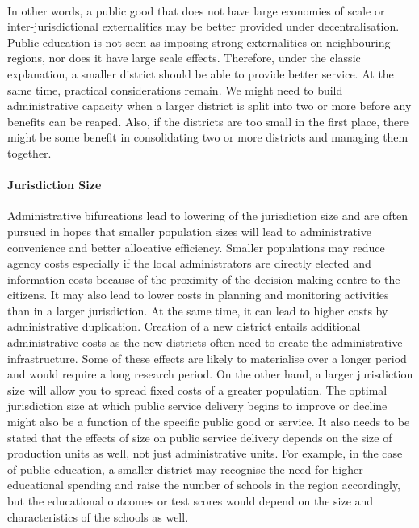 \documentclass[12pt, a4paper]{article}
\begin{document}
\paragraph{} In other words, a public good that does not have large economies of scale or inter-jurisdictional externalities may be better provided under decentralisation. Public education is not seen as imposing strong externalities on neighbouring regions, nor does it have large scale effects. Therefore, under the classic explanation, a smaller district should be able to provide better service. At the same time, practical considerations remain. We might need to build administrative capacity when a larger district is split into two or more before any benefits can be reaped. Also, if the districts are too small in the first place, there might be some benefit in consolidating two or more districts and managing them together.  
	
\paragraph{Jurisdiction Size} Administrative bifurcations lead to lowering of the jurisdiction size and are often pursued in hopes that smaller population sizes will lead to administrative convenience and better allocative efficiency. Smaller populations may reduce agency costs especially if the local administrators are directly elected and information costs because of the proximity of the decision-making-centre to the citizens. It may also lead to lower costs in planning and monitoring activities than in a larger jurisdiction. At the same time, it can lead to higher costs by administrative duplication. Creation of a new district entails additional administrative costs as the new districts often need to create the administrative infrastructure. Some of these effects are likely to materialise over a longer period and would require a long research period. On the other hand, a larger jurisdiction size will allow you to spread fixed costs of a greater population. \nocite{allers2016effects} \nocite{lassen_jurisdiction_2011} The optimal jurisdiction size at which public service delivery begins to improve or decline might also be a function of the specific public good or service. It also needs to be stated that the effects of size on public service delivery depends on the size of production units as well, not just administrative units. For example, in the case of public education, a smaller district may recognise the need for higher educational spending and raise the number of schools in the region accordingly, but the educational outcomes or test scores would depend on the size and characteristics of the schools as well. 
	
\end{document}
